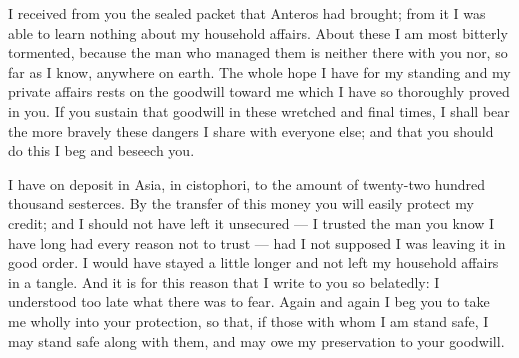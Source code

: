 

 I received from you the sealed packet that Anteros had brought; from it I was able to learn nothing about my household affairs. About these I am most bitterly tormented, because the man who managed them is neither there with you nor, so far as I know, anywhere on earth. The whole hope I have for my standing and my private affairs rests on the goodwill toward me which I have so thoroughly proved in you. If you sustain that goodwill in these wretched and final times, I shall bear the more bravely these dangers I share with everyone else; and that you should do this I beg and beseech you.

 I have on deposit in Asia, in cistophori, to the amount of twenty-two hundred thousand sesterces. By the transfer of this money you will easily protect my credit; and I should not have left it unsecured --- I trusted the man you know I have long had every reason not to trust --- had I not supposed I was leaving it in good order. I would have stayed a little longer and not left my household affairs in a tangle. And it is for this reason that I write to you so belatedly: I understood too late what there was to fear. Again and again I beg you to take me wholly into your protection, so that, if those with whom I am stand safe, I may stand safe along with them, and may owe my preservation to your goodwill.
